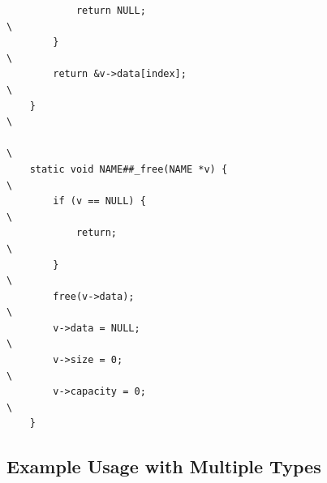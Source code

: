 \documentclass[11pt]{article}
\begin{document}
\begin{verbatim}
            return NULL;                                                      \
        }                                                                     \
        return &v->data[index];                                               \
    }                                                                         \
                                                                              \
    static void NAME##_free(NAME *v) {                                         \
        if (v == NULL) {                                                       \
            return;                                                           \
        }                                                                     \
        free(v->data);                                                        \
        v->data = NULL;                                                       \
        v->size = 0;                                                          \
        v->capacity = 0;                                                      \
    }
\end{verbatim}

\subsection*{Example Usage with Multiple Types}
\end{document}
